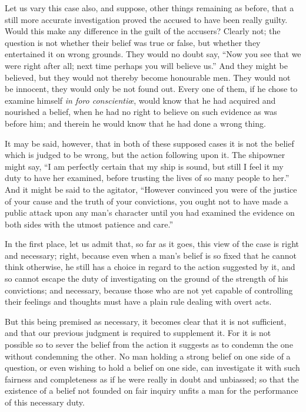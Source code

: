 \documentclass[12pt]{article}
\begin{document}
Let us vary this case also, and suppose, other things remaining as before, that a still more accurate investigation proved the accused to have been really guilty. Would this make any difference in the guilt of the accusers? Clearly not; the question is not whether their belief was true or false, but whether they entertained it on wrong grounds. They would no doubt say, ``Now you see that we were right after all; next time perhaps you will believe us.'' And they might be believed, but they would not thereby become honourable men. They would not be innocent, they would only be not found out. Every one of them, if he chose to examine himself \emph{in foro conscienti\oe}, would know that he had acquired and nourished a belief, when he had no right to believe on such evidence as was before him; and therein he would know that he had done a wrong thing.

It may be said, however, that in both of these supposed cases it is not the belief which is judged to be wrong, but the action following upon it. The shipowner might say, ``I am perfectly certain that my ship is sound, but still I feel it my duty to have her examined, before trusting the lives of so many people to her.'' And it might be said to the agitator, ``However convinced you were of the justice of your cause and the truth of your convictions, you ought not to have made a public attack upon any man's character until you had examined the evidence on both sides with the utmost patience and care.''

In the first place, let us admit that, so far as it goes, this view of the case is right and necessary; right, because even when a man's belief is so fixed that he cannot think otherwise, he still has a choice in regard to the action suggested by it, and so cannot escape the duty of investigating on the ground of the strength of his convictions; and necessary, because those who are not yet capable of controlling their feelings and thoughts must have a plain rule dealing with overt acts.

But this being premised as necessary, it becomes clear that it is not sufficient, and that our previous judgment is required to supplement it. For it is not possible so to sever the belief from the action it suggests as to condemn the one without condemning the other. No man holding a strong belief on one side of a question, or even wishing to hold a belief on one side, can investigate it with such fairness and completeness as if he were really in doubt and unbiassed; so that the existence of a belief not founded on fair inquiry unfits a man for the performance of this necessary duty.
\end{document}
